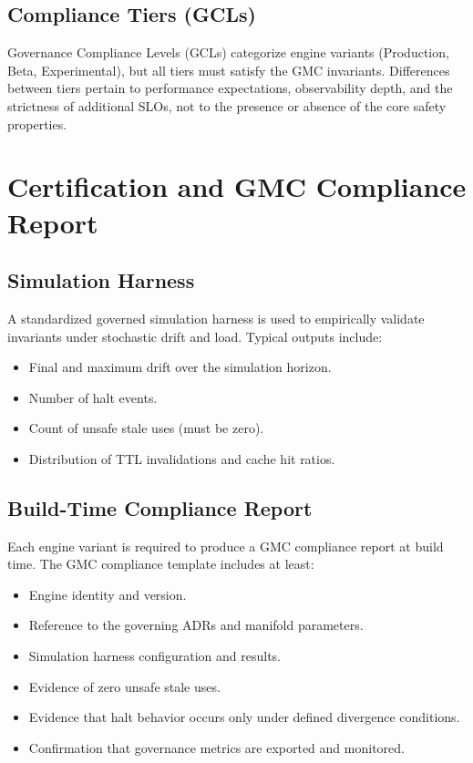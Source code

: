 \documentclass[11pt]{article}
\begin{document}
\subsection{Compliance Tiers (GCLs)}

Governance Compliance Levels (GCLs) categorize engine variants (Production, Beta, Experimental), but all tiers must satisfy the GMC invariants.
Differences between tiers pertain to performance expectations, observability depth, and the strictness of additional SLOs, not to the presence or absence of the core safety properties.

\section{Certification and GMC Compliance Report}

\subsection{Simulation Harness}

A standardized governed simulation harness is used to empirically validate invariants under stochastic drift and load.
Typical outputs include:
\begin{itemize}[noitemsep]
  \item Final and maximum drift over the simulation horizon.
  \item Number of halt events.
  \item Count of unsafe stale uses (must be zero).
  \item Distribution of TTL invalidations and cache hit ratios.
\end{itemize}

\subsection{Build-Time Compliance Report}

Each engine variant is required to produce a GMC compliance report at build time.
The GMC compliance template includes at least:
\begin{itemize}[noitemsep]
  \item Engine identity and version.
  \item Reference to the governing ADRs and manifold parameters.
  \item Simulation harness configuration and results.
  \item Evidence of zero unsafe stale uses.
  \item Evidence that halt behavior occurs only under defined divergence conditions.
  \item Confirmation that governance metrics are exported and monitored.
\end{itemize}
\end{document}
